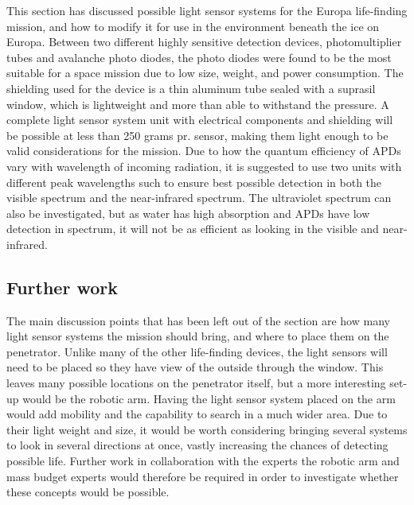 This section has discussed possible light sensor systems for the Europa life-finding mission, and how to modify it for use in the environment beneath the ice on Europa. Between two different highly sensitive detection devices, photomultiplier tubes and avalanche photo diodes, the photo diodes were found to be the most suitable for a space mission due to low size, weight, and power consumption. The shielding used for the device is a thin aluminum tube sealed with a suprasil window, which is lightweight and more than able to withstand the pressure. A complete light sensor system unit with electrical components and shielding will be possible at less than 250 grams pr. sensor, making them light enough to be valid considerations for the mission. Due to how the quantum efficiency of APDs vary with wavelength of incoming radiation, it is suggested to use two units with different peak wavelengths such to ensure best possible detection in both the visible spectrum and the near-infrared spectrum. The ultraviolet spectrum can also be investigated, but as water has high absorption and APDs have low detection in spectrum, it will not be as efficient as looking in the visible and near-infrared.

\subsection{Further work}

The main discussion points that has been left out of the section are how many light sensor systems the mission should bring, and where to place them on the penetrator. Unlike many of the other life-finding devices, the light sensors will need to be placed so they have view of the outside through the window. This leaves many possible locations on the penetrator itself, but a more interesting set-up would be the robotic arm. Having the light sensor system placed on the arm would add mobility and the capability to search in a much wider area. Due to their light weight and size, it would be worth considering bringing several systems to look in several directions at once, vastly increasing the chances of detecting possible life. Further work in collaboration with the experts the robotic arm and mass budget experts would therefore be required in order to investigate whether these concepts would be possible. 




